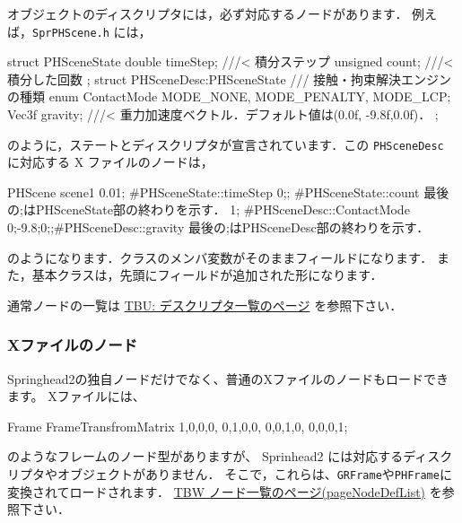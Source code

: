 \KLUDGE オブジェクトのディスクリプタには，必ず対応するノードがあります．
\KLUDGE 例えば，\texttt{SprPHScene.h} には，

\begin{sourcecode}
struct PHSceneState{
    double timeStep;      ///< 積分ステップ
    unsigned count;       ///< 積分した回数
};
struct PHSceneDesc:PHSceneState{
    /// 接触・拘束解決エンジンの種類
    enum ContactMode{ MODE_NONE, MODE_PENALTY, MODE_LCP};
    Vec3f gravity;      ///< 重力加速度ベクトル．デフォルト値は(0.0f, -9.8f,0.0f)．
};
\end{sourcecode}

\KLUDGE のように，ステートとディスクリプタが宣言されています．この \texttt{PHSceneDesc} に対応する X ファイルのノードは，
\begin{sourcecode}
PHScene scene1{                                                                     0.01;     #PHSceneState::timeStep
    0;;       #PHSceneState::count     最後の;はPHSceneState部の終わりを示す．
    1;        #PHSceneDesc::ContactMode
    0;-9.8;0;;#PHSceneDesc::gravity    最後の;はPHSceneDesc部の終わりを示す．
}
\end{sourcecode}

\KLUDGE のようになります．クラスのメンバ変数がそのままフィールドになります．
\KLUDGE また，基本クラスは，先頭にフィールドが追加された形になります．

\KLUDGE 通常ノードの一覧は \url{TBU: デスクリプタ一覧のページ} を参照下さい．

\subsubsection{Xファイルのノード}
Springhead2の独自ノードだけでなく、普通のXファイルのノードもロードできます。
Xファイルには、
\begin{sourcecode}
Frame{
    FrameTransfromMatrix{ 1,0,0,0, 0,1,0,0, 0,0,1,0, 0,0,0,1; }
}
\end{sourcecode}
\KLUDGE のようなフレームのノード型がありますが、
Sprinhead2 には対応するディスクリプタやオブジェクトがありません．
\KLUDGE そこで，これらは、\texttt{GRFrame}や\texttt{PHFrame}に
\KLUDGE 変換されてロードされます．
\url{TBW ノード一覧のページ(pageNodeDefList)} を参照下さい．


